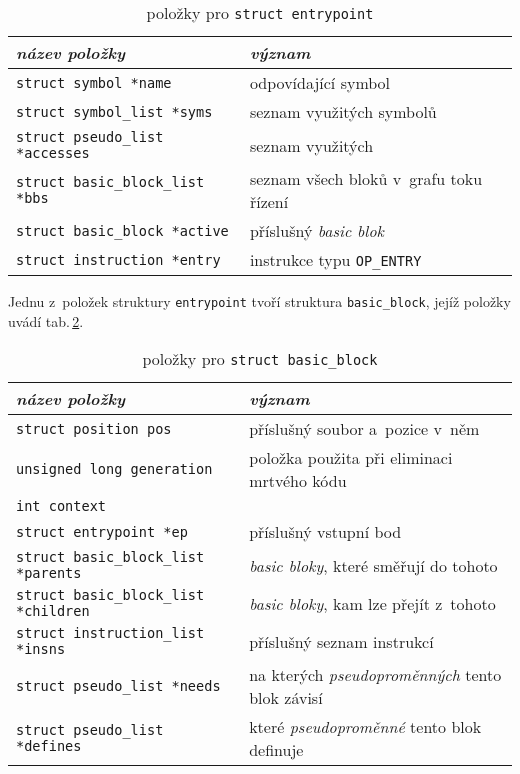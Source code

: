 \begin{table}[!h]
    \begin{center}
        \begin{tabular}{|l|l|}
            \hline
            \textsl{název položky} & \textsl{význam} \\
            \hline
        	    \texttt{struct symbol *name} & odpovídající symbol \\
            	\texttt{struct symbol\_list *syms} & seznam využitých symbolů \\
            	\texttt{struct pseudo\_list *accesses} & seznam využitých \uv{pseudoproměnných} \\
             	\texttt{struct basic\_block\_list *bbs} & seznam všech bloků v~grafu toku řízení \\
                \texttt{struct basic\_block *active} & příslušný \emph{basic blok} \\
                \texttt{struct instruction *entry} & instrukce typu \texttt{OP\_ENTRY} \\
            \hline
        \end{tabular}
        \caption{položky pro \texttt{struct entrypoint}}
        \label{tab:entrypoint}
    \end{center}
\end{table}

Jednu z~položek struktury \texttt{entrypoint} tvoří struktura \texttt{basic\_block},
jejíž položky uvádí tab.\,\ref{tab:basicblock}.

\begin{table}[!h]
    \begin{center}
        \begin{tabular}{|l|l|}
            \hline
            \textsl{název položky} & \textsl{význam} \\
            \hline
            	\texttt{struct position pos} & příslušný soubor a~pozice v~něm \\
                \texttt{unsigned long generation} & položka použita při eliminaci mrtvého kódu \\
                \texttt{int context} & \\
                \texttt{struct entrypoint *ep} & příslušný vstupní bod \\
                \texttt{struct basic\_block\_list *parents} & \emph{basic bloky}, které směřují do tohoto\\
                \texttt{struct basic\_block\_list *children} & \emph{basic bloky}, kam lze přejít z~tohoto \\
	            \texttt{struct instruction\_list *insns} & příslušný seznam instrukcí \\
	            \texttt{struct pseudo\_list *needs} & na kterých \emph{pseudoproměnných} tento blok závisí \\
                \texttt{struct pseudo\_list *defines} & které \emph{pseudoproměnné} tento blok definuje\\
            \hline
        \end{tabular}
        \caption{položky pro \texttt{struct basic\_block}}
        \label{tab:basicblock}
    \end{center}
\end{table}

